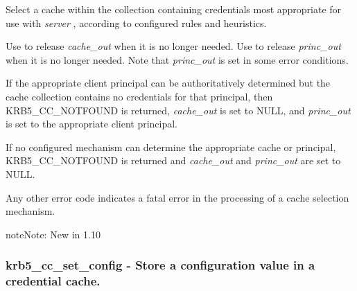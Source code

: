 \documentclass[letterpaper,10pt,english]{sphinxmanual}
\begin{document}
Select a cache within the collection containing credentials most appropriate for use with \emph{server} , according to configured rules and heuristics.

Use {\hyperref[appdev/refs/api/krb5_cc_close:krb5_cc_close]{}} to release \emph{cache\_out} when it is no longer needed. Use {\hyperref[appdev/refs/api/krb5_free_principal:krb5_free_principal]{}} to release \emph{princ\_out} when it is no longer needed. Note that \emph{princ\_out} is set in some error conditions.

If the appropriate client principal can be authoritatively determined but the cache collection contains no credentials for that principal, then KRB5\_CC\_NOTFOUND is returned, \emph{cache\_out} is set to NULL, and \emph{princ\_out} is set to the appropriate client principal.

If no configured mechanism can determine the appropriate cache or principal, KRB5\_CC\_NOTFOUND is returned and \emph{cache\_out} and \emph{princ\_out} are set to NULL.

Any other error code indicates a fatal error in the processing of a cache selection mechanism.

\begin{notice}{note}{Note:}
New in 1.10
\end{notice}


\subsubsection{krb5\_cc\_set\_config -  Store a configuration value in a credential cache.}
\label{appdev/refs/api/krb5_cc_set_config::doc}\label{appdev/refs/api/krb5_cc_set_config:krb5-cc-set-config-store-a-configuration-value-in-a-credential-cache}

\begin{fulllineitems}
\label{appdev/refs/api/krb5_cc_set_config:krb5_cc_set_config}
\end{fulllineitems}
\end{document}
